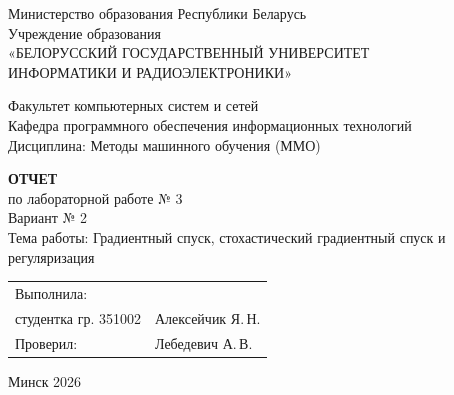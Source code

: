 \documentclass[14pt,a4paper]{extarticle}
\begin{document}
\begin{titlepage}
    \begin{center}
        Министерство образования Республики Беларусь\\[0.15cm]
        Учреждение образования\\[0.15cm]
        «БЕЛОРУССКИЙ ГОСУДАРСТВЕННЫЙ УНИВЕРСИТЕТ\\
        ИНФОРМАТИКИ И РАДИОЭЛЕКТРОНИКИ»
    \end{center}
    
    \vspace{0.4cm}
    
    \begin{flushleft}
        Факультет компьютерных систем и сетей\\[0.1cm]
        Кафедра программного обеспечения информационных технологий\\[0.1cm]
        Дисциплина: Методы машинного обучения (ММО)
    \end{flushleft}
    
    \vspace{2.2cm}
    
    \begin{center}
        \large\textbf{ОТЧЕТ}\\[0.2cm]
        \normalsize
        {по лабораторной работе № 3}\\[0.2cm]
        Вариант № 2\\[0.3cm]
        Тема работы: Градиентный спуск, стохастический градиентный спуск и регуляризация
    \end{center}
    
    \vspace{2.5cm}
    
    \noindent
    \begin{tabular}{@{}p{}@{}p{}@{}}
        Выполнила: & \\
        студентка гр. 351002 & Алексейчик Я.\,Н. \\[0.5cm]
        Проверил: & Лебедевич А.\,В.
    \end{tabular}
    
    \vfill
    
    \begin{center}
        Минск 2026
    \end{center}
\end{titlepage}
\end{document}
